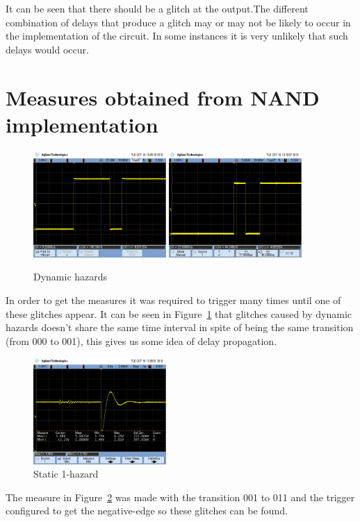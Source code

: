 It can be seen that there should be a glitch at the output.The different combination of delays that produce a glitch may or may not be likely 
to occur in the implementation of the circuit. In some instances it is very 
unlikely that such delays would occur.


\section*{Measures obtained from NAND implementation}
\begin{figure}[H] 
\begin{center}
\includegraphics[width=0.45\textwidth]{data/000to001.png}
\includegraphics[width=0.45\textwidth]{data/000to001_11.png}
\end{center}
\caption{Dynamic hazards}
\label{fig:measure_dynamic}
\end{figure} 
In order to get the measures it was required to trigger many times until one of these 
glitches appear. It can be seen in Figure~\ref{fig:measure_dynamic} that glitches caused by dynamic hazards doesn't share the same time interval in spite of being the same transition
(from 000 to 001), this gives us some idea of delay propagation. 

\begin{figure}[H] 
\begin{center}
\includegraphics[width=0.45\textwidth]{data/001to011.png}
\end{center}
\caption{Static 1-hazard}
\label{fig:measure_static}
\end{figure} 
The measure in Figure~\ref{fig:measure_static} was made with the transition 001 to 011 and the
 trigger configured to get the negative-edge so these glitches can be found.


